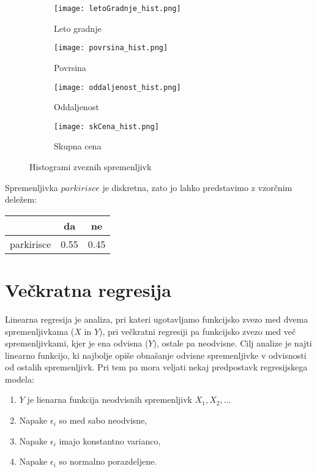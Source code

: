 \documentclass[a4paper, 12pt]{article}
\begin{document}
\begin{figure}[H]
\begin{subfigure}{0.5\textwidth}
	\texttt{[image: letoGradnje\_hist.png]}
	\caption{Leto gradnje}
	\label{figure:1a}
\end{subfigure}
\begin{subfigure}{0.5\textwidth}
	\texttt{[image: povrsina\_hist.png]}
	\caption{Povrsina}
	\label{figure:1b}
\end{subfigure}

\begin{subfigure}{0.5\textwidth}
	\texttt{[image: oddaljenost\_hist.png]}
	\caption{Oddaljenost}
	\label{figure:1c}
\end{subfigure}
\begin{subfigure}{0.5\textwidth}
	\texttt{[image: skCena\_hist.png]}
	\caption{Skupna cena}
	\label{figure:1d}
\end{subfigure}
\caption{Histogrami zveznih spremenljivk}
\label{figure:1}
\end{figure}

Spremenljivka $ parkirisce $ je diskretna, zato jo lahko predstavimo z
vzorčnim deležem:

\begin{center}
\begin{tabular}{ c|cc }
	& da & ne \\
	\hline
	parkirisce & 0.55 & 0.45 \\
\end{tabular}
\end{center}

\section{Večkratna regresija}

Linearna regresija je analiza, pri kateri ugotavljamo funkcijsko zvezo med
dvema spremenljivkama ($ X $ in $ Y $), pri večkratni regresiji pa funkcijsko
zvezo med več spremenljivkami, kjer je ena odvisna ($ Y $), ostale pa neodvisne.
Cilj analize je najti linearno funkcijo, ki najbolje opiše obnašanje odvisne
spremenljivke v odvisnosti od ostalih spremenljivk. Pri tem pa mora veljati
nekaj predpostavk regresijskega modela:
\begin{enumerate}
	\item $ Y $ je lienarna funkcija neodvisnih spremenljivk $ X_{1}, X_{2}, \dots $
	\item Napake $ \epsilon_{i} $ so med sabo neodvisne,
	\item Napake $ \epsilon_{i} $ imajo konstantno varianco,
	\item Napake $ \epsilon_{i} $ so normalno porazdeljene.
\end{enumerate}
\end{document}
